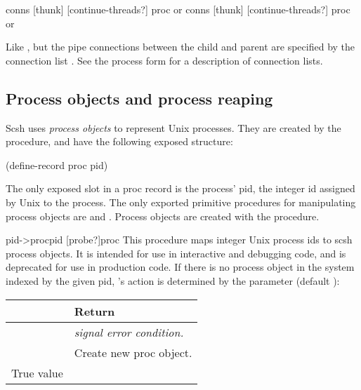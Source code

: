   {conns [thunk] [continue-threads?]} {proc or \sharpf}
 {conns [thunk] [continue-threads?]} {proc or \sharpf}
\begin{desc}
    Like , but the pipe connections between the child and parent
    are specified by the connection list . 
    See the 
    process form for a description of connection lists.
\end{desc}

\subsection{Process objects and process reaping}
\label{sec:proc-objects}
Scsh uses \emph{process objects} to represent Unix processes.
They are created by the  procedure, and have the following
exposed structure:
\begin{code}
(define-record proc
        pid)\end{code}
The only exposed slot in a proc record is the process' pid, 
the integer id assigned by Unix to the process.
The only exported primitive procedures for manipulating process objects
are  and .
Process objects are created with the  procedure.

\begin{defundesc}{pid->proc}{pid [probe?]}{proc}
This procedure maps integer Unix process ids to scsh process objects.
It is intended for use in interactive and debugging code, 
and is deprecated for use in production code.
If there is no process object in the system indexed by the given pid,
's action is determined by the  parameter
(default \sharpf): 
\begin{center}
\begin{tabular}{|l|l|}
\hline
\var{probe?}    &       Return                          \\ \hline\hline
\sharpf         &       \emph{signal error condition.}  \\ \hline
\ex{'create}    &       Create new proc object.         \\ \hline
True value      &       \sharpf                         \\ \hline
\end{tabular}
\end{center}
\end{defundesc}

